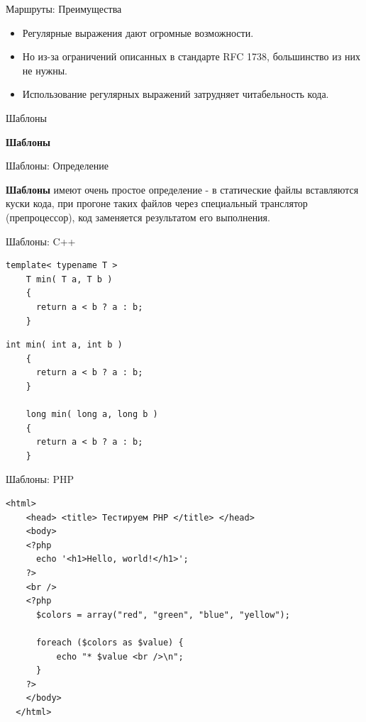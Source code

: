 \begin{frame}{Маршруты: Преимущества}

  \begin{itemize}
    \item
      Регулярные выражения дают огромные возможности.
    \item
      Но из-за ограничений \newline
      описанных в стандарте RFC 1738,
      большинство из них не нужны.
    \item
      Использование регулярных выражений затрудняет читабельность кода.
  \end{itemize}

\end{frame}


\begin{frame}{Шаблоны}

  \textbf{Шаблоны}

\end{frame}


\begin{frame}{Шаблоны: Определение}

  \textbf{Шаблоны} имеют очень простое определение - в статические файлы вставляются
  куски кода, при прогоне таких файлов через специальный транслятор
  (препроцессор), код заменяется результатом его выполнения.

\end{frame}


\begin{frame}[fragile]{Шаблоны: C++}

  \begin{lstlisting}[style=cpp]
    template< typename T >
    T min( T a, T b )
    {
      return a < b ? a : b;
    }
  \end{lstlisting}

  \begin{lstlisting}[style=cpp]
    int min( int a, int b )
    {
      return a < b ? a : b;
    }

    long min( long a, long b )
    {
      return a < b ? a : b;
    }
  \end{lstlisting}

\end{frame}

\begin{frame}[fragile]{Шаблоны: PHP}

  \begin{lstlisting}[style=php]
  <html>
    <head> <title> Тестируем PHP </title> </head>
    <body>
    <?php
      echo '<h1>Hello, world!</h1>';
    ?>
    <br />
    <?php
      $colors = array("red", "green", "blue", "yellow");

      foreach ($colors as $value) {
          echo "* $value <br />\n";
      }
    ?>
    </body>
  </html>
  \end{lstlisting}

\end{frame}

